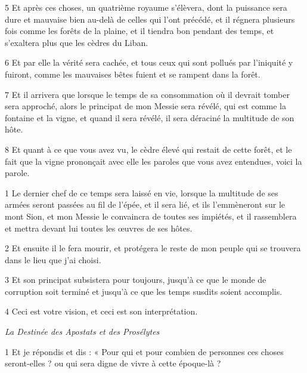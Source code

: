 \par 5 Et après ces choses, un quatrième royaume s'élèvera, dont la puissance sera dure et mauvaise bien au-delà de celles qui l'ont précédé, et il régnera plusieurs fois comme les forêts de la plaine, et il tiendra bon pendant des temps, et s'exaltera plus que les cèdres du Liban.

\par 6 Et par elle la vérité sera cachée, et tous ceux qui sont pollués par l'iniquité y fuiront, comme les mauvaises bêtes fuient et se rampent dans la forêt.

\par 7 Et il arrivera que lorsque le temps de sa consommation où il devrait tomber sera approché, alors le principat de mon Messie sera révélé, qui est comme la fontaine et la vigne, et quand il sera révélé, il sera déraciné la multitude de son hôte.

\par 8 Et quant à ce que vous avez vu, le cèdre élevé qui restait de cette forêt, et le fait que la vigne prononçait avec elle les paroles que vous avez entendues, voici la parole.


\par 1 Le dernier chef de ce temps sera laissé en vie, lorsque la multitude de ses armées seront passées au fil de l'épée, et il sera lié, et ils l'emmèneront sur le mont Sion, et mon Messie le convaincra de toutes ses impiétés, et il rassemblera et mettra devant lui toutes les œuvres de ses hôtes.

\par 2 Et ensuite il le fera mourir, et protégera le reste de mon peuple qui se trouvera dans le lieu que j'ai choisi.

\par 3 Et son principat subsistera pour toujours, jusqu'à ce que le monde de corruption soit terminé et jusqu'à ce que les temps susdits soient accomplis.

\par 4 Ceci est votre vision, et ceci est son interprétation.



\par \textit{La Destinée des Apostats et des Prosélytes}

\par 1 Et je répondis et dis : « Pour qui et pour combien de personnes ces choses seront-elles ? ou qui sera digne de vivre à cette époque-là ?

